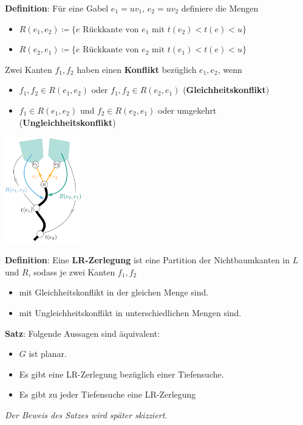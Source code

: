\textbf{Definition}: Für eine Gabel $e_1=uv_1$, $e_2=uv_2$ definiere die Mengen
\begin{itemize}
	\item $R(e_1,e_2)\coloneqq\{e \text{ Rückkante von }e_1 \text{ mit }t(e_2)<t(e)<u\}$
	\item $R(e_2,e_1)\coloneqq\{e \text{ Rückkante von }e_2 \text{ mit }t(e_1)<t(e)<u\}$
\end{itemize} 
Zwei Kanten $f_1,f_2$ haben einen \textbf{Konflikt} bezüglich $e_1,e_2$, wenn
\begin{itemize}
	\item $f_1,f_2\in R(e_1,e_2)$ oder $f_1,f_2\in R(e_2,e_1)$ (\textbf{Gleichheitskonflikt})
	\item $f_1 \in R(e_1,e_2)$ und $f_2\in R(e_2,e_1)$ oder umgekehrt (\textbf{Ungleichheitskonflikt})
\end{itemize}
\begin{center}
	\includegraphics[width=0.25\textwidth]{images/konflikt.png}
\end{center}

\textbf{Definition}: Eine \textbf{LR-Zerlegung} ist eine Partition der Nichtbaumkanten in $L$ und $R$, sodass je zwei Kanten $f_1,f_2$
\begin{itemize}
	\item mit Gleichheitskonflikt in der gleichen Menge sind.
	\item mit Ungleichheitskonflikt in unterschiedlichen Mengen sind.
\end{itemize}
\bigskip
\textbf{Satz}: Folgende Aussagen sind äquivalent:
\begin{itemize}
	\item $G$ ist planar.
	\item Es gibt eine LR-Zerlegung bezüglich einer Tiefensuche.
	\item Es gibt zu jeder Tiefensuche eine LR-Zerlegung
\end{itemize}
\textit{Der Beweis des Satzes wird später skizziert}.\\


